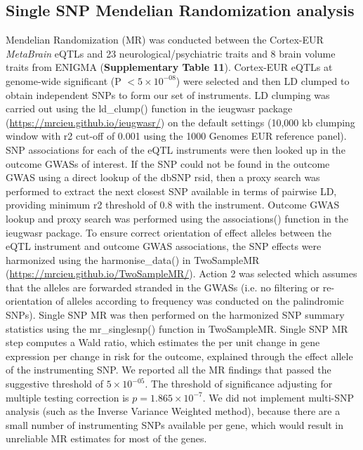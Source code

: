 \subsection{Single SNP Mendelian Randomization analysis}
Mendelian Randomization (MR) was conducted between the Cortex-EUR \textit{MetaBrain}  eQTLs and 23 neurological/psychiatric traits and 8 brain volume traits from ENIGMA (\textbf{Supplementary Table 11}). Cortex-EUR eQTLs at genome-wide significant (P $< 5 \times 10^{-08}$) were selected and then LD clumped to obtain independent SNPs to form our set of instruments. LD clumping was carried out using the ld\_clump() function in the ieugwasr package (\url{https://mrcieu.github.io/ieugwasr/}) on the default settings (10,000 kb clumping window with r2 cut-off of 0.001 using the 1000 Genomes EUR reference panel). SNP associations for each of the eQTL instruments were then looked up in the outcome GWASs of interest. If the SNP could not be found in the outcome GWAS using a direct lookup of the dbSNP rsid, then a proxy search was performed to extract the next closest SNP available in terms of pairwise LD, providing minimum r2 threshold of 0.8 with the instrument. Outcome GWAS lookup and proxy search was performed using the associations() function in the ieugwasr package. To ensure correct orientation of effect alleles between the eQTL instrument and outcome GWAS associations, the SNP effects were harmonized using the harmonise\_data() in TwoSampleMR (\url{https://mrcieu.github.io/TwoSampleMR/}). Action 2 was selected which assumes that the alleles are forwarded stranded in the GWASs (i.e. no filtering or re-orientation of alleles according to frequency was conducted on the palindromic SNPs). Single SNP MR was then performed on the harmonized SNP summary statistics using the mr\_singlesnp() function in TwoSampleMR. Single SNP MR step computes a Wald ratio, which estimates the per unit change in gene expression per change in risk for the outcome, explained through the effect allele of the instrumenting SNP. We reported all the MR findings that passed the suggestive threshold of $5 \times 10^{-05}$. The threshold of significance adjusting for multiple testing correction is $p=1.865 \times 10^{-7}$. We did not implement multi-SNP analysis (such as the Inverse Variance Weighted method), because there are a small number of instrumenting SNPs available per gene, which would result in unreliable MR estimates for most of the genes. 

